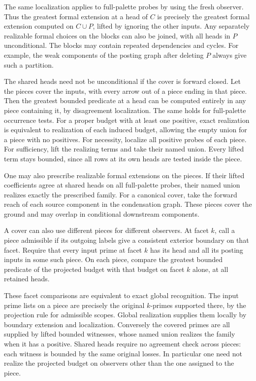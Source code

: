 The same localization applies to full-palette
probes by using the fresh observer. Thus the
greatest formal extension at a head of $C$
is precisely the greatest formal extension
computed on $C\cup P$, lifted by ignoring
the other inputs. Any separately realizable
formal choices on the blocks can also be
joined, with all heads in $P$ unconditional.
The blocks may contain repeated dependencies
and cycles. For example, the weak components
of the posting graph after deleting $P$
always give such a partition.

The shared heads need not be unconditional
if the cover is forward closed. Let the
pieces cover the inputs, with every arrow
out of a piece ending in that piece.
Then the greatest bounded predicate at a
head can be computed entirely in any piece
containing it, by disagreement localization.
The same holds for full-palette occurrence
tests. For a proper budget with at least one
positive, exact realization is equivalent to
realization of each induced budget, allowing
the empty union for a piece with no positives.
For necessity,
localize all positive probes of each piece.
For sufficiency, lift the realizing terms
and take their named union. Every lifted
term stays bounded, since all rows at its
own heads are tested inside the piece.

One may also prescribe realizable formal
extensions on the pieces. If their lifted
coefficients agree at shared heads on all
full-palette probes, their named union
realizes exactly the prescribed family.
For a canonical cover, take the forward
reach of each source component in the
condensation graph. These pieces cover the
ground and may overlap in conditional
downstream components.

A cover can also use different pieces for
different observers. At facet $k$, call a
piece admissible if its outgoing labels
give a consistent exterior boundary on
that facet. Require that every input
prime at facet $k$ has its head and all
its posting inputs in some such piece.
On each piece, compare the greatest
bounded predicate of the projected budget
with that budget on facet $k$ alone,
at all retained heads.

These facet comparisons are equivalent to
exact global recognition. The input prime
lists on a piece are precisely the original
$k$-primes supported there, by the
projection rule for admissible scopes.
Global realization supplies them locally
by boundary extension and localization.
Conversely the covered primes are all
supplied by lifted bounded witnesses,
whose named union realizes the family
when it has a positive. Shared heads
require no agreement check across
pieces: each witness is bounded by the
same original losses. In particular one
need not realize the projected budget
on observers other than the one assigned
to the piece.

